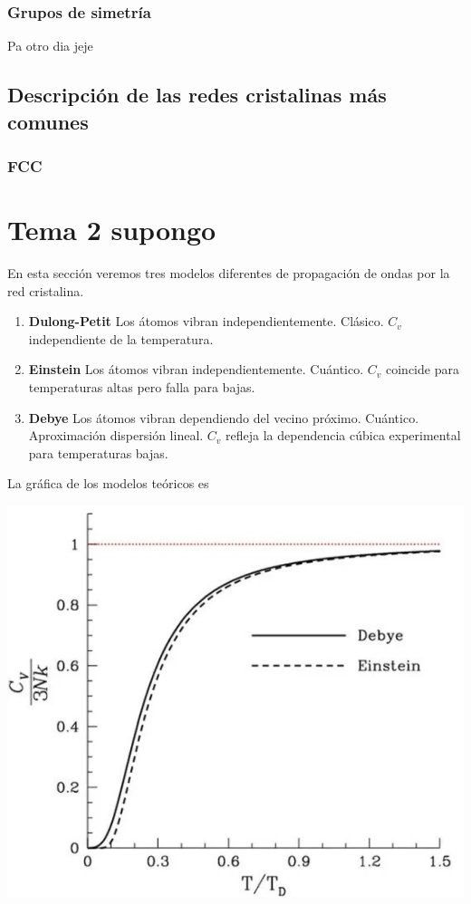 \documentclass[leqno]{article}
\begin{document}
\subsubsection{Grupos de simetría}
Pa otro dia jeje

\subsection{Descripción de las redes cristalinas más comunes}
\subsubsection{FCC}


\section{Tema 2 supongo}
En esta sección veremos tres modelos diferentes de propagación de ondas por la red cristalina.
\begin{enumerate}[topsep=-6pt, itemsep=0pt]
  \item \textbf{Dulong-Petit} Los átomos vibran independientemente. Clásico. $C_v$ independiente de la temperatura.
  \item \textbf{Einstein} Los átomos vibran independientemente. Cuántico. $C_v$ coincide para temperaturas altas pero falla para bajas.
  \item \textbf{Debye} Los átomos vibran dependiendo del vecino próximo. Cuántico. Aproximación dispersión lineal. $C_v$ refleja la dependencia cúbica experimental para temperaturas bajas.
\end{enumerate}

La gráfica de los modelos teóricos es

\includegraphics[width=\textwidth]{figures/comparisoncv.jpg}
\end{document}
